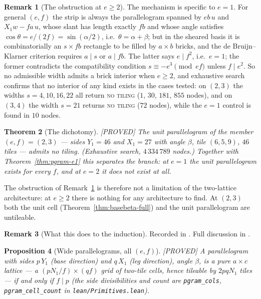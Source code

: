 \documentclass[11pt,reqno]{amsart}
\theoremstyle{plain}
\newtheorem{theorem}{Theorem}
\newtheorem{proposition}[theorem]{Proposition}
\theoremstyle{definition}
\newtheorem{remark}[theorem]{Remark}
\newcommand{\lab}[1]{\hfill\textnormal{\footnotesize\textsc{[#1]}}}
\begin{document}
\begin{remark}[The obstruction at $e\ge2$]\label{rem:e2strip}
The mechanism is specific to $e=1$. For general $(e,f)$ the strip is always the parallelogram
spanned by $eb\,u$ and $X_1w-fa\,u$, whose slant has length exactly $fb$ and whose angle
satisfies $\cos\theta=e/(2f)=\sin(\alpha/2)$, i.e.\ $\theta=\alpha+\beta$; but in the sheared
basis it is combinatorially an $s\times fb$ rectangle to be filled by $a\times b$ bricks, and the
de Bruijn--Klarner criterion requires $a\mid s$ or $a\mid fb$. The latter says $e\mid f^2$, i.e.\
$e=1$; the former contradicts the compatibility condition $s\equiv-e^3\pmod{ef}$ unless
$f\mid e^2$. So no admissible width admits a brick interior when $e\ge2$, and exhaustive search
confirms that no interior of any kind exists in the cases tested: on $(2,3)$ the widths
$s=4,10,16,22$ all return \textsc{no tiling} ($1$, $30$, $181$, $855$ nodes), and on $(3,4)$ the
width $s=21$ returns \textsc{no tiling} ($72$ nodes), while the $e=1$ control is found in $10$
nodes.
\end{remark}

\begin{theorem}[The dichotomy]\label{thm:dichotomy}\lab{PROVED}
The unit parallelogram of the member $(e,f)=(2,3)$ --- sides $Y_1=46$ and $X_1=27$ with angle
$\beta$, tile $(6,5,9)$, $46$ tiles --- admits no tiling. \textup{(Exhaustive search,
$4\,334\,789$ nodes.)} Together with Theorem~\ref{thm:pgram-e1} this separates the branch: at
$e=1$ the unit parallelogram exists for every $f$, and at $e=2$ it does not exist at all.
\end{theorem}

The obstruction of Remark~\ref{rem:e2strip} is therefore not a limitation of the two-lattice
architecture: at $e\ge2$ there is nothing for any architecture to find. At $(2,3)$ both the unit
cell (Theorem~\ref{thm:basebeta-full}) and the unit parallelogram are untileable.

\begin{remark}[What this does to the induction]\label{rem:e2induction}
Recorded in \cite{Obstructions}. Full discussion in \cite{Obstructions}.
\end{remark}

\begin{proposition}[Wide parallelograms, all $(e,f)$]\label{prop:widecol}\lab{PROVED}
A parallelogram with sides $p\,Y_1$ (base direction) and $q\,X_1$ (leg direction), angle $\beta$,
is a pure $a\times c$ lattice --- a $(pN_1/f)\times(qf)$ grid of two-tile cells, hence tileable by
$2pqN_1$ tiles --- if and only if $f\mid p$ (the side divisibilities and count are
\texttt{pgram\_cols}, \texttt{pgram\_cell\_count} in \textup{\texttt{lean/Primitives.lean}}).
\end{proposition}
\end{document}
